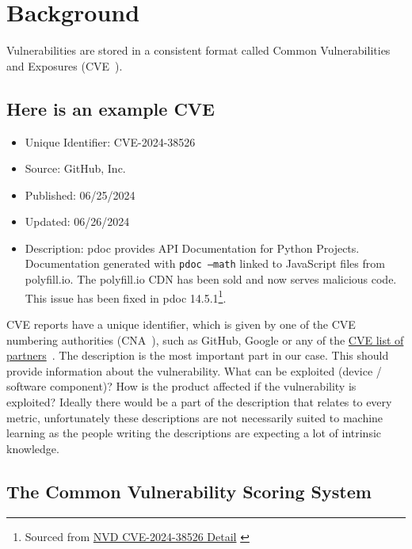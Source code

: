 \documentclass[12pt]{article}
\begin{document}
\section{Background}

Vulnerabilities are stored in a consistent format called Common Vulnerabilities and
Exposures (CVE~\cite{CVE}).

\subsection{Here is an example CVE}
\begin{itemize}

	\item   Unique Identifier: CVE-2024-38526

	\item   Source: GitHub, Inc.

	\item   Published: 06/25/2024

	\item   Updated: 06/26/2024

	\item   Description: pdoc provides API Documentation for Python Projects. Documentation
	      generated with \texttt{pdoc --math} linked to JavaScript files from polyfill.io. The
	      polyfill.io CDN has been sold and now serves malicious code. This issue has been fixed in
	      pdoc 14.5.1\footnote{ Sourced from
		      \href{https://nvd.nist.gov/vuln/detail/CVE-2024-38526}{NVD CVE-2024-38526 Detail}
		      \cite{polyfill}}. \\

\end{itemize}

\bigskip

CVE reports have a unique identifier, which is given by one of the CVE numbering authorities (CNA~\cite{CNA}), such as
GitHub, Google or any of the \href{https://www.cve.org/PartnerInformation/ListofPartners}{CVE list of
	partners}~\cite{partners}.
The description is the most important part in our case. This should provide information about the
vulnerability. What can be exploited (device / software component)? How is the product affected if
the vulnerability is exploited? Ideally there would be a part of the description that relates to every metric,
unfortunately these descriptions are not necessarily suited to machine learning as the people
writing the descriptions are expecting a lot of intrinsic knowledge.

\subsection{The Common Vulnerability Scoring System}
\end{document}
